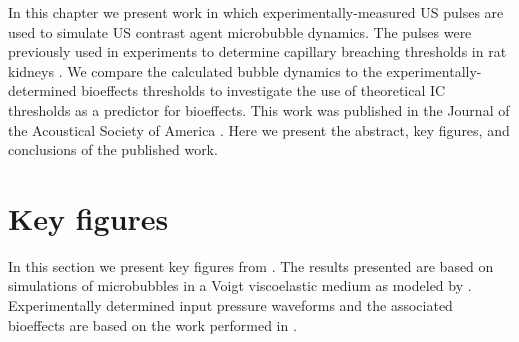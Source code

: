 In this chapter we present work in which experimentally-measured
\ac{US} pulses are used to simulate \ac{US} contrast agent microbubble
dynamics. The pulses were previously used in experiments to determine
capillary breaching thresholds in rat kidneys \citep{Miller2008b}. We
compare the calculated bubble dynamics to the
experimentally-determined bioeffects thresholds to investigate the use
of theoretical \ac{IC} thresholds as a predictor for bioeffects. This
work was published in the Journal of the Acoustical Society of America
\citep{Patterson2012, Patterson2012a}. Here we present the abstract, key figures, and
conclusions of the published work.
%


\section{Key figures}
\label{sec:usbe_bubble_key_figures}
In this section we present key figures from \cite{Patterson2012a}. The
results presented are based on simulations of microbubbles in a Voigt
viscoelastic medium as modeled by \cite{Yang2005}. Experimentally
determined input pressure waveforms and the associated bioeffects are
based on the work performed in \cite{Miller2008b}.

